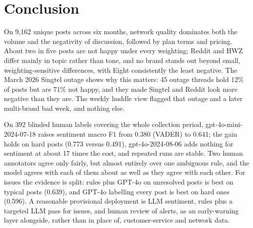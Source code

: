 \documentclass[11pt,a4paper]{article}
\begin{document}
\section{Conclusion}

On 9,162 unique posts across six months, network quality dominates both the volume and the negativity of discussion, followed by plan terms and pricing. About two in five posts are not happy under every weighting; Reddit and HWZ differ mainly in topic rather than tone, and no brand stands out beyond small, weighting-sensitive differences, with Eight consistently the least negative. The March 2026 Singtel outage shows why this matters: 45 outage threads hold 12\% of posts but are 71\% not happy, and they made Singtel and Reddit look more negative than they are. The weekly huddle view flagged that outage and a later multi-brand bad week, and nothing else.

On 392 blinded human labels covering the whole collection period, gpt-4o-mini-2024-07-18 raises sentiment macro F1 from 0.380 (VADER) to 0.641; the gain holds on hard posts (0.773 versus 0.491), gpt-4o-2024-08-06 adds nothing for sentiment at about 17 times the cost, and repeated runs are stable. Two human annotators agree only fairly, but almost entirely over one ambiguous rule, and the model agrees with each of them about as well as they agree with each other. For issues the evidence is split: rules plus GPT-4o on unresolved posts is best on typical posts (0.639), and GPT-4o labelling every post is best on hard ones (0.596). A reasonable provisional deployment is LLM sentiment, rules plus a targeted LLM pass for issues, and human review of alerts, as an early-warning layer alongside, rather than in place of, customer-service and network data.
\end{document}
